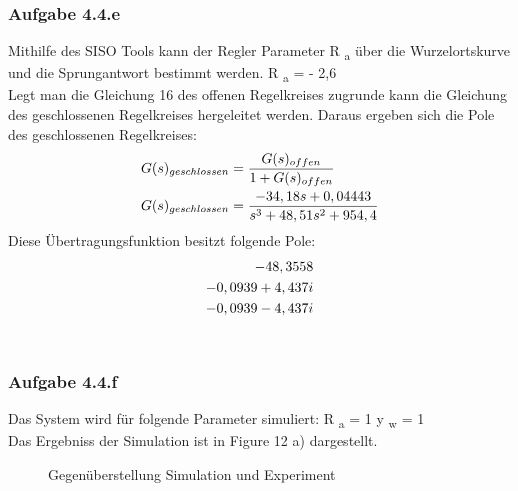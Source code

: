 \documentclass[10pt]{scrartcl}
\begin{document}
\subsubsection{Aufgabe 4.4.e}	
Mithilfe des SISO Tools kann der Regler Parameter R \textsubscript{a}
über die Wurzelortskurve und die Sprungantwort bestimmt werden.
R \textsubscript{a} = - 2,6 \\
Legt man die Gleichung 16 des offenen Regelkreises zugrunde kann die Gleichung des geschlossenen Regelkreises hergeleitet werden.
Daraus ergeben sich die Pole des geschlossenen Regelkreises:
\begin{align}
G(s)_{geschlossen} &=\frac{G(s)_{offen}}{1+G(s)_{offen}} \notag\\
G(s)_{geschlossen}&=\frac{-34,18s+0,04443}{s^3+48,51s^2+954,4}
\end{align}
Diese Übertragungsfunktion besitzt folgende Pole:
\begin{align}
-48,3558 \notag \\
-0,0939+4,437i  \notag \\
-0,0939-4,437i \notag 
 \end{align} \\
\subsubsection{Aufgabe 4.4.f}	
Das System wird für folgende Parameter simuliert:
R \textsubscript{a} = 1
 y \textsubscript{w} = 1\\
Das Ergebniss der Simulation ist in Figure 12 a) dargestellt. 
\begin{figure} [H]
\caption{ Gegenüberstellung Simulation und Experiment} 
\end{figure}
\end{document}
